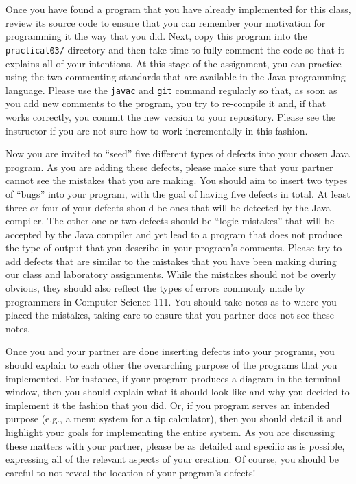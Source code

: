 Once you have found a program that you have already implemented for this class, review its source code to ensure that
you can remember your motivation for programming it the way that you did. Next, copy this program into the {\tt
practical03/} directory and then take time to fully comment the code so that it explains all of your intentions. At this
stage of the assignment, you can practice using the two commenting standards that are available in the Java programming
language. Please use the {\tt javac} and {\tt git} command regularly so that, as soon as you add new comments to the
program, you try to re-compile it and, if that works correctly, you commit the new version to your repository. Please
see the instructor if you are not sure how to work incrementally in this fashion.

Now you are invited to ``seed'' five different types of defects into your chosen Java program. As you are adding these
defects, please make sure that your partner cannot see the mistakes that you are making. You should aim to insert two
types of ``bugs'' into your program, with the goal of having five defects in total. At least three or four of your defects
should be ones that will be detected by the Java compiler. The other one or two defects should be ``logic mistakes''
that will be accepted by the Java compiler and yet lead to a program that does not produce the type of output that you
describe in your program's comments. Please try to add defects that are similar to the mistakes that you have been
making during our class and laboratory assignments. While the mistakes should not be overly obvious, they should also
reflect the types of errors commonly made by programmers in Computer Science 111. You should take notes as to where you
placed the mistakes, taking care to ensure that you partner does not see these notes.

Once you and your partner are done inserting defects into your programs, you should explain to each other the
overarching purpose of the programs that you implemented. For instance, if your program produces a diagram in the
terminal window, then you should explain what it should look like and why you decided to implement it the fashion that
you did. Or, if you program serves an intended purpose (e.g., a menu system for a tip calculator), then you should
detail it and highlight your goals for implementing the entire system. As you are discussing these matters with your
partner, please be as detailed and specific as is possible, expressing all of the relevant aspects of your creation. Of
course, you should be careful to not reveal the location of your program's defects!

